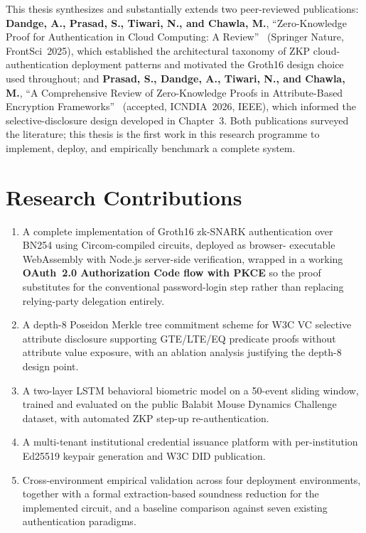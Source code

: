 \documentclass[12pt,a4paper,oneside]{report}
\begin{document}
This thesis synthesizes and substantially extends two peer-reviewed
publications: \textbf{Dandge, A., Prasad, S., Tiwari, N., and Chawla, M.},
``Zero-Knowledge Proof for Authentication in Cloud Computing: A
Review''~\cite{dandge2025zkpcloud} (Springer Nature, FrontSci~2025), which
established the architectural taxonomy of ZKP cloud-authentication
deployment patterns and motivated the Groth16 design choice used
throughout; and \textbf{Prasad, S., Dandge, A., Tiwari, N., and Chawla,
M.}, ``A Comprehensive Review of Zero-Knowledge Proofs in Attribute-Based
Encryption Frameworks''~\cite{prasad2025abereview} (accepted, ICNDIA~2026,
IEEE), which informed the selective-disclosure design developed in
Chapter~3. Both publications surveyed the literature; this thesis is the
first work in this research programme to implement, deploy, and
empirically benchmark a complete system.

\section{Research Contributions}

\begin{enumerate}
  \item A complete implementation of Groth16 zk-SNARK authentication over
        BN254 using Circom-compiled circuits, deployed as browser-
        executable WebAssembly with Node.js server-side verification,
        wrapped in a working \textbf{OAuth~2.0 Authorization Code flow
        with PKCE} so the proof substitutes for the conventional
        password-login step rather than replacing relying-party
        delegation entirely.
  \item A depth-8 Poseidon Merkle tree commitment scheme for W3C VC
        selective attribute disclosure supporting GTE/LTE/EQ predicate
        proofs without attribute value exposure, with an ablation analysis
        justifying the depth-8 design point.
  \item A two-layer LSTM behavioral biometric model on a 50-event sliding
        window, trained and evaluated on the public Balabit Mouse
        Dynamics Challenge dataset, with automated ZKP step-up
        re-authentication.
  \item A multi-tenant institutional credential issuance platform with
        per-institution Ed25519 keypair generation and W3C DID
        publication.
  \item Cross-environment empirical validation across four deployment
        environments, together with a formal extraction-based soundness
        reduction for the implemented circuit, and a baseline comparison
        against seven existing authentication paradigms.
\end{enumerate}
\end{document}
